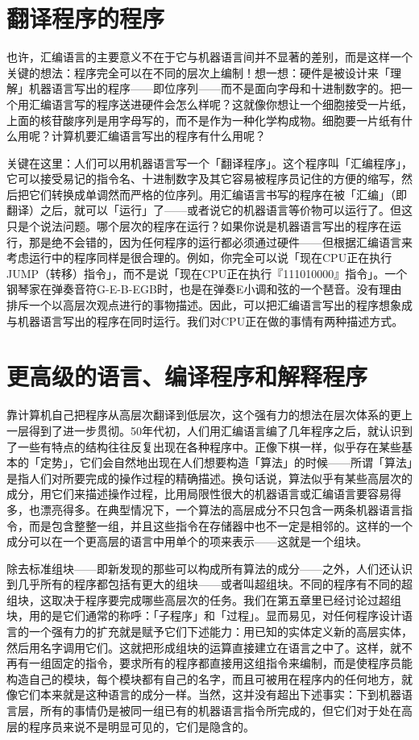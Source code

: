 \documentclass[
  12pt,
  twoside,
  openright,
  oldfontcommands,
]{memoir}
\begin{document}
\section{翻译程序的程序}

也许，汇编语言的主要意义不在于它与机器语言间并不显著的差别，而是这样一个关键的想法：程序完全可以在不同的层次上编制！想一想：硬件是被设计来「理解」机器语言写出的程序------即位序列------而不是面向字母和十进制数字的。把一个用汇编语言写的程序送进硬件会怎么样呢？这就像你想让一个细胞接受一片纸，上面的核苷酸序列是用字母写的，而不是作为一种化学构成物。细胞要一片纸有什么用呢？计算机要汇编语言写出的程序有什么用呢？

关键在这里：人们可以用机器语言写一个「翻译程序」。这个程序叫「汇编程序」，它可以接受易记的指令名、十进制数字及其它容易被程序员记住的方便的缩写，然后把它们转换成单调然而严格的位序列。用汇编语言书写的程序在被「汇编」（即翻译）之后，就可以「运行」了------或者说它的机器语言等价物可以运行了。但这只是个说法问题。哪个层次的程序在运行？如果你说是机器语言写出的程序在运行，那是绝不会错的，因为任何程序的运行都必须通过硬件------但根据汇编语言来考虑运行中的程序同样是很合理的。例如，你完全可以说「现在CPU正在执行JUMP（转移）指令」，而不是说「现在CPU正在执行『111010000』指令」。一个钢琴家在弹奏音符G-E-B-EGB时，也是在弹奏E小调和弦的一个琶音。没有理由排斥一个以高层次观点进行的事物描述。因此，可以把汇编语言写出的程序想象成与机器语言写出的程序在同时运行。我们对CPU正在做的事情有两种描述方式。

\section{更高级的语言、编译程序和解释程序}

靠计算机自己把程序从高层次翻译到低层次，这个强有力的想法在层次体系的更上一层得到了进一步贯彻。50年代初，人们用汇编语言编了几年程序之后，就认识到了一些有特点的结构往往反复出现在各种程序中。正像下棋一样，似乎存在某些基本的「定势」，它们会自然地出现在人们想要构造「算法」的时候------所谓「算法」是指人们对所要完成的操作过程的精确描述。换句话说，算法似乎有某些高层次的成分，用它们来描述操作过程，比用局限性很大的机器语言或汇编语言要容易得多，也漂亮得多。在典型情况下，一个算法的高层成分不只包含一两条机器语言指令，而是包含整整一组，并且这些指令在存储器中也不一定是相邻的。这样的一个成分可以在一个更高层的语言中用单个的项来表示------这就是一个组块。

除去标准组块------即新发现的那些可以构成所有算法的成分------之外，人们还认识到几乎所有的程序都包括有更大的组块------或者叫超组块。不同的程序有不同的超组块，这取决于程序要完成哪些高层次的任务。我们在第五章里已经讨论过超组块，用的是它们通常的称呼：「子程序」和「过程」。显而易见，对任何程序设计语言的一个强有力的扩充就是赋予它们下述能力：用已知的实体定义新的高层实体，然后用名字调用它们。这就把形成组块的运算直接建立在语言之中了。这样，就不再有一组固定的指令，要求所有的程序都直接用这组指令来编制，而是使程序员能构造自己的模块，每个模块都有自己的名字，而且可被用在程序内的任何地方，就像它们本来就是这种语言的成分一样。当然，这并没有超出下述事实：下到机器语言层，所有的事情仍是被同一组已有的机器语言指令所完成的，但它们对于处在高层的程序员来说不是明显可见的，它们是隐含的。
\end{document}
